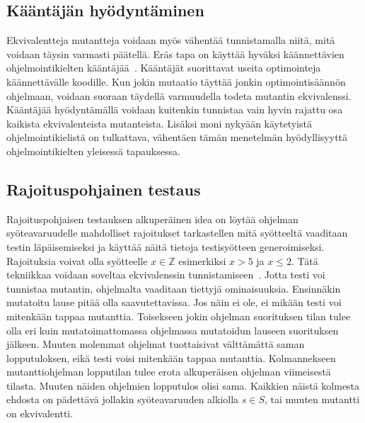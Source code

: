 \documentclass[finnish]{tktltiki2}
\begin{document}
\subsection{Kääntäjän hyödyntäminen}
Ekvivalentteja mutantteja voidaan myös vähentää tunnistamalla niitä, mitä voidaan täysin varmasti päätellä. Eräs tapa on käyttää hyväksi käännettävien ohjelmointikielten kääntäjää~\cite{Offutt94usingcompiler}. Kääntäjät suorittavat useita optimointeja käännettävälle koodille. Kun jokin mutaatio täyttää jonkin optimointisäännön ohjelmaan, voidaan suoraan täydellä varmuudella todeta mutantin ekvivalenssi. Kääntäjää hyödyntämällä voidaan kuitenkin tunnistaa vain hyvin rajattu osa kaikista ekvivalenteista mutanteista. Lisäksi moni nykyään käytetyistä ohjelmointikielistä on tulkattava, vähentäen tämän menetelmän hyödyllisyyttä ohjelmointikielten yleisessä tapauksessa.

\subsection{Rajoituspohjainen testaus}
Rajoituspohjaisen testauksen alkuperäinen idea on löytää ohjelman syöteavaruudelle mahdolliset rajoitukset tarkastellen mitä syötteeltä vaaditaan testin läpäisemiseksi ja käyttää näitä tietoja testisyötteen generoimiseksi. Rajoituksia voivat olla syötteelle $x \in \mathbb{Z}$ esimerkiksi $x > 5$ ja $x \leq 2$. Tätä tekniikkaa voidaan soveltaa ekvivalenssin tunnistamiseen~\cite{OffuttP96}. Jotta testi voi tunnistaa mutantin, ohjelmalta vaaditaan tiettyjä ominaisuuksia. Ensinnäkin mutatoitu lause pitää olla saavutettavissa. Jos näin ei ole, ei mikään testi voi mitenkään tappaa mutanttia. Toisekseen jokin ohjelman suorituksen tilan tulee olla eri kuin mutatoimattomassa ohjelmassa mutatoidun lauseen suorituksen jälkeen. Muuten molemmat ohjelmat tuottaisivat välttämättä saman lopputuloksen, eikä testi voisi mitenkään tappaa mutanttia. Kolmannekseen mutanttiohjelman lopputilan tulee erota alkuperäisen ohjelman viimeisestä tilasta. Muuten näiden ohjelmien lopputulos olisi sama. Kaikkien näistä kolmesta ehdosta on pädettävä jollakin syöteavaruuden alkiolla $s \in S$, tai muuten mutantti on ekvivalentti. 
\end{document}
